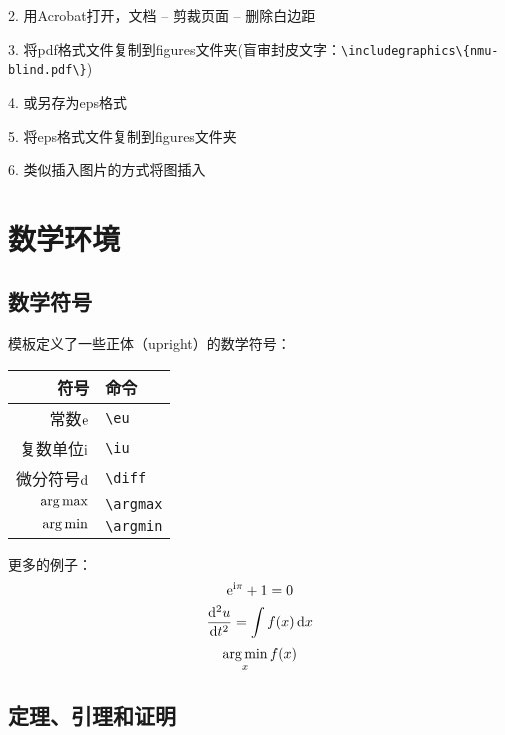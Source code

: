 2. 用Acrobat打开，文档 -- 剪裁页面 -- 删除白边距

3. 将pdf格式文件复制到figures文件夹(盲审封皮文字：\verb|\includegraphics\{nmu-blind.pdf\}|)

4. 或另存为eps格式

5. 将eps格式文件复制到figures文件夹

6. 类似插入图片的方式将图插入

\section{数学环境}

\subsection{数学符号}

模板定义了一些正体（upright）的数学符号：
\begin{center}
	\begin{tabular}{rl}
		\toprule
		符号                 & 命令 \\
		\midrule
		常数$\mathrm{e}$     & \verb|\eu| \\
		复数单位$\mathrm{i}$ & \verb|\iu| \\
		微分符号$\mathop{}\!\mathrm{d}$ & \verb|\diff| \\
		$\operatorname*{arg\,max}$         & \verb|\argmax| \\
		$\operatorname*{arg\,min}$         & \verb|\argmin| \\
		\bottomrule
	\end{tabular}
\end{center}

更多的例子：
\begin{equation}
\mathrm{e}^{\mathrm{i}\pi} + 1 = 0
\end{equation}
\begin{equation}
\frac{\mathop{}\!\mathrm{d}^2u}{\mathop{}\!\mathrm{d} t^2} = \int f(x) \mathop{}\!\mathrm{d} x
\end{equation}
\begin{equation}
\operatorname*{arg\,min}_x f(x)
\end{equation}

\subsection{定理、引理和证明}

